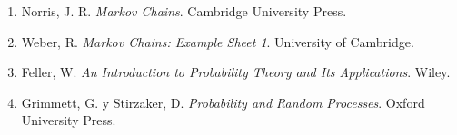 \documentclass[12pt,a4paper]{article}
\theoremstyle{definition}
\begin{document}
\begin{enumerate}[leftmargin=1.1cm]
    \item Norris, J. R. \textit{Markov Chains}. Cambridge University Press.
    \item Weber, R. \textit{Markov Chains: Example Sheet 1}. University of Cambridge.
    \item Feller, W. \textit{An Introduction to Probability Theory and Its Applications}. Wiley.
    \item Grimmett, G. y Stirzaker, D. \textit{Probability and Random Processes}. Oxford University Press.
\end{enumerate}
\end{document}
